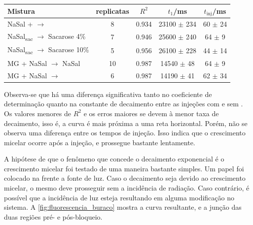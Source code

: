 	\begin{table}[h]
		{%
			\begin{tabular}{p{4cm} c c c c}
				\toprule
				Mistura                                        & replicatas & \(R^2\) & \(t_1\)/ms        & \(t_{\mathrm{inj}}\)/ms \\ \midrule
				NaSal + \agua{} \(\to\) \agua                  & 8          & 0.934   & 23100 \(\pm\) 234 & 60 \(\pm\) 24           \\
				NaSal\textsubscript{sac} \(\to\) Sacarose 4\%  & 7          & 0.946   & 25600 \(\pm\) 240 & 64 \(\pm\) 9            \\
				NaSal\textsubscript{sac} \(\to\) Sacarose 10\% & 5          & 0.956   & 26100 \(\pm\) 228 & 44 \(\pm\) 14           \\ \midrule
				MG + NaSal \(\to\) NaSal                       & 10         & 0.987   & 14540 \(\pm\) 48  & 64 \(\pm\) 9            \\
				MG + NaSal \(\to\) \agua                       & 6          & 0.987   & 14190 \(\pm\) 41  & 62 \(\pm\) 34           \\ \bottomrule
			\end{tabular}
		}{}
	\end{table} 
	
	Observa-se que há uma diferença significativa tanto no coeficiente de determinação quanto na constante de decaimento entre as injeções com e sem \TTAB{}. Os valores menores de \(R^2\) e os erros maiores se devem à menor taxa de decaimento, isso é, a curva é mais próxima a uma reta horizontal.  Porém, não se observa uma diferença entre os tempos de injeção. Isso indica que o crescimento micelar ocorre após a injeção, e prossegue bastante lentamente.
	
	A hipótese de que o fenômeno que concede o decaimento exponencial é o crescimento micelar foi testado de uma maneira bastante simples. Um papel foi colocado na frente a fonte de luz. Caso o decaimento seja devido ao crescimento micelar, o mesmo deve prosseguir sem a incidência de radiação. Caso contrário, é possível que a incidência de luz esteja resultando em alguma modificação no sistema. A \autoref{fig:fluorescencia_buraco} mostra a curva resultante, e a junção das duas regiões pré- e pós-bloqueio.
	
